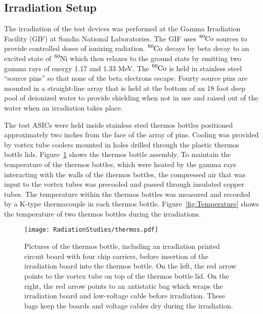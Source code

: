 \subsection{Irradiation Setup}

The irradiation of the test devices was performed at the Gamma Irradiation Facility (GIF) at Sandia National Laboratories.  The GIF uses $\ce{^{60}Co}$ sources to provide controlled doses of ionizing radiation. $\ce{^{60}Co}$ decays by beta decay to an excited state of $\ce{^{60}Ni}$ which then relaxes to the ground state by emitting two gamma rays of energy 1.17 and 1.33 MeV. The $\ce{^{60}Co}$ is held in stainless steel ``source pins'' so that none of the beta electrons escape. Fourty source pins are mounted in a straight-line array that is held at the bottom of an 18 foot deep pool of deionized water to provide shielding when not in use and raised out of the water when an irradiation takes place.

The test ASICs were held inside stainless steel thermos bottles positioned approximately two inches from the face of the array of pins. Cooling was provided by vortex tube coolers mounted in holes drilled through the plastic thermos bottle lids. Figure~\ref{fig:Thermos} shows the thermos bottle assembly. To maintain the temperature of the thermos bottles, which were heated by the gamma rays interacting with the walls of the thermos bottles, the compressed air that was input to the vortex tubes was precooled and passed through insulated copper tubes. The temperature within the thermos bottles was measured and recorded by a K-type thermocouple in each thermos bottle. Figure~\ref{fig:Temperature} shows the temperature of two thermos bottles during the irradiations.

\begin{figure}[h!]
\begin{center}
\texttt{[image: RadiationStudies/thermos.pdf]}
\end{center}
\caption{Pictures of the thermos bottle, including an irradiation printed circuit board with four chip carriers, before insertion of the irradiation board into the thermos bottle. On the left, the red arrow points to the vortex tube on top of the thermos bottle lid. On the right, the red arrow points to an antistatic bag which wraps the irradiation board and low-voltage cable before irradiation. These bags keep the boards and voltage cables dry during the irradiation.}
\label{fig:Thermos}
\end{figure}


